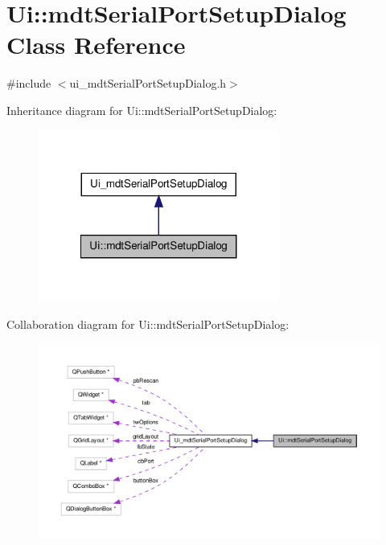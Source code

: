 \hypertarget{class_ui_1_1mdt_serial_port_setup_dialog}{\section{Ui\-:\-:mdt\-Serial\-Port\-Setup\-Dialog Class Reference}
\label{class_ui_1_1mdt_serial_port_setup_dialog}
}


{\ttfamily \#include $<$ui\-\_\-mdt\-Serial\-Port\-Setup\-Dialog.\-h$>$}



Inheritance diagram for Ui\-:\-:mdt\-Serial\-Port\-Setup\-Dialog\-:
\nopagebreak
\begin{figure}[H]
\begin{center}
\leavevmode
\includegraphics[width=224pt]{class_ui_1_1mdt_serial_port_setup_dialog__inherit__graph}
\end{center}
\end{figure}


Collaboration diagram for Ui\-:\-:mdt\-Serial\-Port\-Setup\-Dialog\-:
\nopagebreak
\begin{figure}[H]
\begin{center}
\leavevmode
\includegraphics[width=350pt]{class_ui_1_1mdt_serial_port_setup_dialog__coll__graph}
\end{center}
\end{figure}
